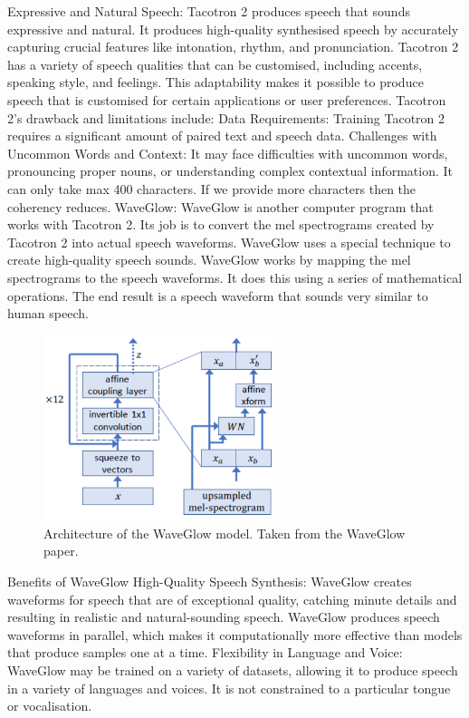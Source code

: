 \documentclass{article}
\begin{document}
Expressive and Natural Speech: Tacotron 2 produces speech that sounds expressive and natural. It produces high-quality synthesised speech by accurately capturing crucial features like intonation, rhythm, and pronunciation.
Tacotron 2 has a variety of speech qualities that can be customised, including accents, speaking style, and feelings. This adaptability makes it possible to produce speech that is customised for certain applications or user preferences.
Tacotron 2's drawback and limitations include:
Data Requirements: Training Tacotron 2 requires a significant amount of paired text and speech data.
Challenges with Uncommon Words and Context: It may face difficulties with uncommon words, pronouncing proper nouns, or understanding complex contextual information.
It can only take max 400 characters. If we provide more characters then the coherency reduces.
WaveGlow:
WaveGlow is another computer program that works with Tacotron 2. Its job is to convert the mel spectrograms created by Tacotron 2 into actual speech waveforms. WaveGlow uses a special technique to create high-quality speech sounds.
WaveGlow works by mapping the mel spectrograms to the speech waveforms. It does this using a series of mathematical operations. The end result is a speech waveform that sounds very similar to human speech.

\begin{figure}[htbp]
    \centering
    \includegraphics[width=0.6\textwidth]{waveglow.png}
    \caption{Architecture of the WaveGlow model. Taken from the WaveGlow paper.}
    \label{fig:waveglow}
\end{figure}

Benefits of WaveGlow
High-Quality Speech Synthesis: WaveGlow creates waveforms for speech that are of exceptional quality, catching minute details and resulting in realistic and natural-sounding speech.
WaveGlow produces speech waveforms in parallel, which makes it computationally more effective than models that produce samples one at a time.
Flexibility in Language and Voice: WaveGlow may be trained on a variety of datasets, allowing it to produce speech in a variety of languages and voices. It is not constrained to a particular tongue or vocalisation.
\end{document}
